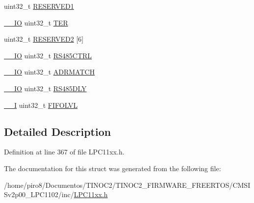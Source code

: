 \begin{DoxyCompactItemize}
\item 
uint32\+\_\+t \hyperlink{group___l_p_c11xx___definitions_ga2df6c0a645ba420331a1d6c1a7d32785}{R\+E\+S\+E\+R\+V\+E\+D1}
\item 
\hyperlink{group___c_m_s_i_s__core__definitions_gaec43007d9998a0a0e01faede4133d6be}{\+\_\+\+\_\+\+IO} uint32\+\_\+t \hyperlink{group___l_p_c11xx___definitions_gab9eca1b8b66856a78a64820be99130e1}{T\+ER}
\item 
uint32\+\_\+t \hyperlink{group___l_p_c11xx___definitions_ga529759b9e0e7aba3cb0e6f2b5c0b93ed}{R\+E\+S\+E\+R\+V\+E\+D2} \mbox{[}6\mbox{]}
\item 
\hyperlink{group___c_m_s_i_s__core__definitions_gaec43007d9998a0a0e01faede4133d6be}{\+\_\+\+\_\+\+IO} uint32\+\_\+t \hyperlink{group___l_p_c11xx___definitions_ga7a486c0c1ea4054b08a3893a6d7d1202}{R\+S485\+C\+T\+RL}
\item 
\hyperlink{group___c_m_s_i_s__core__definitions_gaec43007d9998a0a0e01faede4133d6be}{\+\_\+\+\_\+\+IO} uint32\+\_\+t \hyperlink{group___l_p_c11xx___definitions_gaf2171616d6659b7f82a217b465ba0e3d}{A\+D\+R\+M\+A\+T\+CH}
\item 
\hyperlink{group___c_m_s_i_s__core__definitions_gaec43007d9998a0a0e01faede4133d6be}{\+\_\+\+\_\+\+IO} uint32\+\_\+t \hyperlink{group___l_p_c11xx___definitions_ga115176a87a83f57041b8ee50e2a4bc98}{R\+S485\+D\+LY}
\item 
\hyperlink{group___c_m_s_i_s__core__definitions_gaf63697ed9952cc71e1225efe205f6cd3}{\+\_\+\+\_\+I} uint32\+\_\+t \hyperlink{group___l_p_c11xx___definitions_ga3a853929f0e5b479297d55f150bf017e}{F\+I\+F\+O\+L\+VL}
\end{DoxyCompactItemize}


\subsection{Detailed Description}


Definition at line 367 of file L\+P\+C11xx.\+h.



The documentation for this struct was generated from the following file\+:\begin{DoxyCompactItemize}
\item 
/home/piro8/\+Documentos/\+T\+I\+N\+O\+C2/\+T\+I\+N\+O\+C2\+\_\+\+F\+I\+R\+M\+W\+A\+R\+E\+\_\+\+F\+R\+E\+E\+R\+T\+O\+S/\+C\+M\+S\+I\+Sv2p00\+\_\+\+L\+P\+C1102/inc/\hyperlink{_l_p_c11xx_8h}{L\+P\+C11xx.\+h}\end{DoxyCompactItemize}
